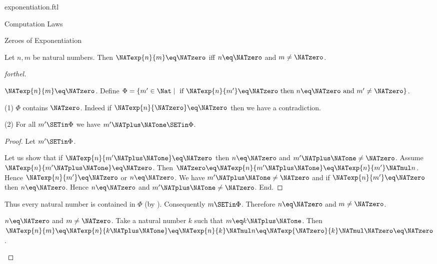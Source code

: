 \documentclass{stex}
\begin{document}
\begin{smodule}{exponentiation.ftl}
\begin{sfragment}{Computation Laws}
  \begin{sfragment}{Zeroes of Exponentiation}
    \begin{proposition}[forthel,id=ARITHMETIC_09_3860221447372800]
      Let $n, m$ be natural numbers.
      Then $\NATexp{n}{m} \eq \NATzero$ iff $n \eq \NATzero$ and $m \neq \NATzero$.
    \end{proposition}
    \begin{proof}[forthel]
      \begin{case}{$\NATexp{n}{m} \eq \NATzero$.}
        Define $\Phi = \{ m' \in \Nat \mid\text{ if }\NATexp{n}{m'} \eq \NATzero\text{ then }n \eq \NATzero\text{ and }m' \neq \NATzero \}$.

        (1) $\Phi$ contains $\NATzero$.
        Indeed if $\NATexp{n}{\NATzero} \eq \NATzero$ then we have a contradiction.

        (2) For all $m' \SETin \Phi$ we have $m' \NATplus \NATone \SETin \Phi$.
        \begin{proof}
          Let $m' \SETin \Phi$.

          Let us show that if $\NATexp{n}{m' \NATplus \NATone} \eq \NATzero$ then $n \eq \NATzero$ and $m' \NATplus \NATone \neq \NATzero$.
            Assume $\NATexp{n}{m' \NATplus \NATone} \eq \NATzero$.
            Then $\NATzero \eq \NATexp{n}{m' \NATplus \NATone} \eq \NATexp{n}{m'} \NATmul n$.
            Hence $\NATexp{n}{m'} \eq \NATzero$ or $n \eq \NATzero$.
            We have $m' \NATplus \NATone \neq \NATzero$ and if $\NATexp{n}{m'} \eq \NATzero$ then $n \eq \NATzero$.
            Hence $n \eq \NATzero$ and $m' \NATplus \NATone \neq \NATzero$.
          End.
        \end{proof}

        Thus every natural number is contained in $\Phi$ (by ).
        Consequently $m \SETin \Phi$.
        Therefore $n \eq \NATzero$ and $m \neq \NATzero$.
      \end{case}

      \begin{case}{$n \eq \NATzero$ and $m \neq \NATzero$.}
        Take a natural number $k$ such that $m \eq k \NATplus \NATone$.
        Then $\NATexp{n}{m}
          \eq \NATexp{n}{k \NATplus \NATone}
          \eq \NATexp{n}{k} \NATmul n
          \eq \NATexp{\NATzero}{k} \NATmul \NATzero
          \eq \NATzero$.
      \end{case}
    \end{proof}
  \end{sfragment}
\end{sfragment}
\end{smodule}
\end{document}
